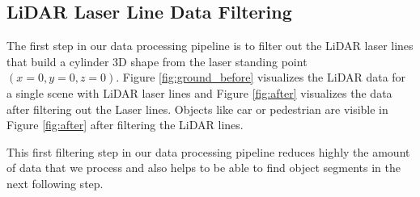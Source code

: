 %
%
%


\subsection{LiDAR Laser Line Data Filtering}
The first step in our data processing pipeline is to filter out the LiDAR laser lines that build
a cylinder 3D shape from the laser standing point $(x=0, y=0, z=0)$. Figure \ref{fig:ground_before} visualizes the LiDAR data for a single scene with LiDAR laser lines and Figure \ref{fig:after} visualizes the data after
filtering out the Laser lines. Objects like car or pedestrian are
visible in Figure \ref{fig:after} after filtering the LiDAR lines.

This first filtering step in our data processing pipeline reduces highly the amount of data that we process and
also helps to be able to find object segments in the next following step.

